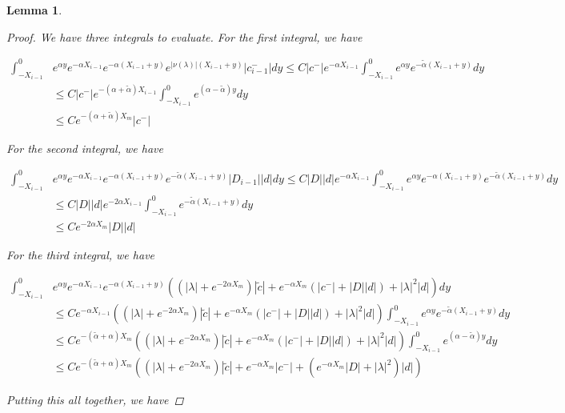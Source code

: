 \documentclass[12pt]{article}
\newtheorem{lemma}{Lemma}
\begin{document}
\begin{lemma}
\begin{proof}
We have three integrals to evaluate. For the first integral, we have

\begin{align*}
\int_{-X_{i-1}}^0 &e^{\alpha y} e^{-\alpha X_{i-1}} e^{-\alpha(X_{i-1} + y)} e^{|\nu(\lambda)|(X_{i-1} + y)} |c_{i-1}^-| dy \leq C |c^-| e^{-\alpha X_{i-1}} \int_{-X_{i-1}}^0 e^{\alpha y} e^{-\tilde{\alpha}(X_{i-1} + y)} dy \\
&\leq C |c^-| e^{-(\alpha + \tilde{\alpha}) X_{i-1}} \int_{-X_{i-1}}^0 e^{(\alpha - \tilde{\alpha}) y} dy \\
&\leq C e^{-(\alpha + \tilde{\alpha}) X_m} |c^-|
\end{align*}

For the second integral, we have

\begin{align*}
\int_{-X_{i-1}}^0 &e^{\alpha y} e^{-\alpha X_{i-1}} e^{-\alpha(X_{i-1} + y)} e^{-\tilde{\alpha}(X_{i-1} + y)}|D_{i-1}||d|  dy \leq C |D||d| e^{-\alpha X_{i-1}} \int_{-X_{i-1}}^0 e^{\alpha y} e^{-\alpha(X_{i-1} + y)} e^{-\tilde{\alpha}(X_{i-1} + y)} dy \\
&\leq C |D||d| e^{-2 \alpha X_{i-1}} \int_{-X_{i-1}}^0 e^{-\tilde{\alpha}(X_{i-1} + y)} dy \\
&\leq C  e^{-2 \alpha X_m} |D||d|
\end{align*}

For the third integral, we have

\begin{align*}
\int_{-X_{i-1}}^0 &e^{\alpha y} e^{-\alpha X_{i-1}} e^{-\alpha(X_{i-1} + y)}( (|\lambda| + e^{-2 \alpha X_m}) |\tilde{c}| + e^{-\alpha X_m}( |c^-| + |D||d|) + |\lambda|^2 |d| ) dy \\
&\leq C e^{-\alpha X_{i-1}} ( (|\lambda| + e^{-2 \alpha X_m}) |\tilde{c}| + e^{-\alpha X_m}( |c^-| + |D||d|) + |\lambda|^2 |d| ) \int_{-X_{i-1}}^0 e^{\alpha y}  e^{-\tilde{\alpha}(X_{i-1} + y)} dy \\
&\leq C e^{-(\tilde{\alpha} + \alpha) X_m} ( (|\lambda| + e^{-2 \alpha X_m}) |\tilde{c}| + e^{-\alpha X_m}( |c^-| + |D||d|) + |\lambda|^2 |d| ) \int_{-X_{i-1}}^0 e^{(\alpha - \tilde{\alpha}) y} dy \\
&\leq C e^{-(\tilde{\alpha} + \alpha) X_m} ( (|\lambda| + e^{-2 \alpha X_m}) |\tilde{c}| + e^{-\alpha X_m} |c^-| + (e^{-\alpha X_m}|D| + |\lambda|^2) |d| )
\end{align*}

Putting this all together, we have


\end{proof}
\end{lemma}
\end{document}
